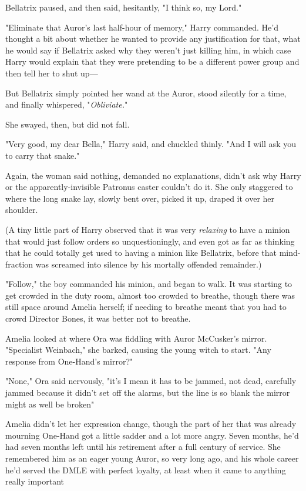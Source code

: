 Bellatrix paused, and then said, hesitantly, "I think so, my Lord."

"Eliminate that Auror's last half-hour of memory," Harry commanded. He'd
thought a bit about whether he wanted to provide any justification for that,
what he would say if Bellatrix asked why they weren't just killing him, in
which case Harry would explain that they were pretending to be a different
power group and then tell her to shut up—

But Bellatrix simply pointed her wand at the Auror, stood silently for a time,
and finally whispered, "\emph{Obliviate.}"

She swayed, then, but did not fall.

"Very good, my dear Bella," Harry said, and chuckled thinly. "And I will ask
you to carry that snake."

Again, the woman said nothing, demanded no explanations, didn't ask why Harry
or the apparently-invisible Patronus caster couldn't do it. She only staggered
to where the long snake lay, slowly bent over, picked it up, draped it over her
shoulder.

(A tiny little part of Harry observed that it was very \emph{relaxing} to have
a minion that would just follow orders so unquestioningly, and even got as far
as thinking that he could totally get used to having a minion like Bellatrix,
before that mind-fraction was screamed into silence by his mortally offended
remainder.)

"Follow," the boy commanded his minion, and began to walk.
\sbreak
It was starting to get crowded in the duty room, almost too crowded to breathe,
though there was still space around Amelia herself; if needing to breathe meant
that you had to crowd Director Bones, it was better not to breathe.

Amelia looked at where Ora was fiddling with Auror McCusker's mirror.
"Specialist Weinbach," she barked, causing the young witch to start. "Any
response from One-Hand's mirror?"

"None," Ora said nervously, "it's{\el} I mean it has to be jammed, not dead,
carefully jammed because it didn't set off the alarms, but the line is so blank
the mirror might as well be broken{\el}"

Amelia didn't let her expression change, though the part of her that was
already mourning One-Hand got a little sadder and a lot more angry. Seven
months, he'd had seven months left until his retirement after a full century of
service. She remembered him as an eager young Auror, so very long ago, and his
whole career he'd served the DMLE with perfect loyalty, at least when it came
to anything really important{\el}

